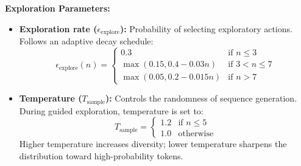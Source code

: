 \documentclass[conference]{IEEEtran}
\begin{document}
\textbf{Exploration Parameters:}
\begin{itemize}
    \item \textbf{Exploration rate ($\epsilon_{\text{explore}}$):} Probability of selecting exploratory actions. Follows an adaptive decay schedule:
    \begin{equation}
    \epsilon_{\text{explore}}(n) = \begin{cases}
    0.3 & \text{if } n \leq 3 \\
    \max(0.15, 0.4 - 0.03n) & \text{if } 3 < n \leq 7 \\
    \max(0.05, 0.2 - 0.015n) & \text{if } n > 7
    \end{cases}
    \end{equation}
    
    \item \textbf{Temperature ($T_{\text{sample}}$):} Controls the randomness of sequence generation. During guided exploration, temperature is set to:
    \begin{equation}
    T_{\text{sample}} = \begin{cases}
    1.2 & \text{if } n \leq 5 \\
    1.0 & \text{otherwise}
    \end{cases}
    \end{equation}
    Higher temperature increases diversity; lower temperature sharpens the distribution toward high-probability tokens.
\end{itemize}
\end{document}
